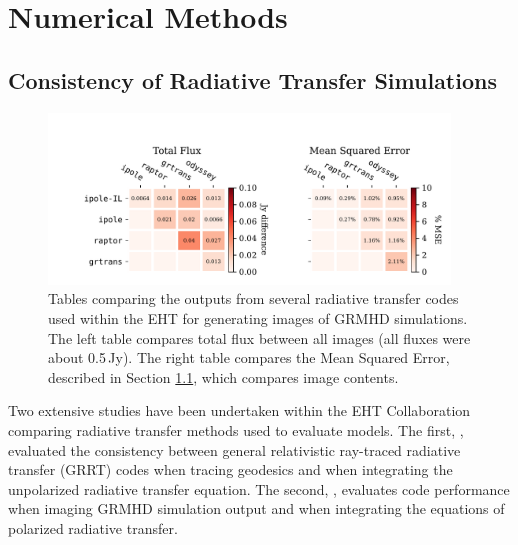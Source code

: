 \section{Numerical Methods}\label{app:numerical}

\subsection{Consistency of Radiative Transfer Simulations}\label{app:radtrans}

\begin{figure}
  \centering
  \includegraphics[width=0.95\textwidth]{figures/grmhd_hi_IntegratedUnpolarizeds_plot.pdf}
  \caption{Tables comparing the outputs from several radiative transfer codes used within the EHT for generating images of GRMHD simulations.
    The left table compares total flux between all images (all fluxes were about 0.5\,Jy).
    The right table compares the Mean Squared Error, described in Section \ref{app:radtrans}, which compares image contents.}
  \label{fig:radtrans_grmhd_comp}
\end{figure}

Two extensive studies have been undertaken within the EHT Collaboration comparing radiative transfer methods used to evaluate models.
The first, \citep{2020ApJ...897..148G}, evaluated the consistency between general relativistic ray-traced radiative transfer (GRRT) codes when tracing geodesics and when integrating the unpolarized radiative transfer equation.
The second, \citet{Prather_et_al_2022}, evaluates code performance when imaging GRMHD simulation output and when integrating the equations of polarized radiative transfer.

